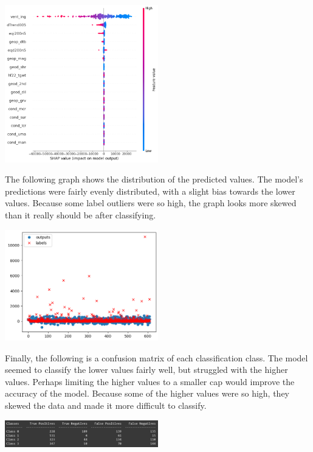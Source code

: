 \documentclass{article}[12pt]
\begin{document}
\begin{center}
    \includegraphics[width=0.5\textwidth]{SHAP.png}
\end{center}

\indent
The following graph shows the distribution of the predicted values. The model's predictions were fairly evenly distributed, with a slight bias towards the lower values. Because some label outliers were so high, the graph looks more skewed than it really should be after classifying.\\

\begin{center}
    \includegraphics[width=0.5\textwidth]{output-label.png}
\end{center}

Finally, the following is a confusion matrix of each classification class. The model seemed to classify the lower values fairly well, but struggled with the higher values. Perhaps limiting the higher values to a smaller cap would improve the accuracy of the model. Because some of the higher values were so high, they skewed the data and made it more difficult to classify.\\

\begin{center}
    \includegraphics[width=0.5\textwidth]{confusion.png}
\end{center}
\end{document}

